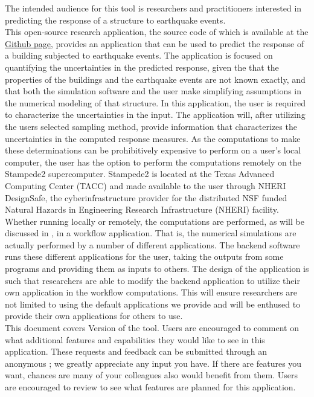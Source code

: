 The intended audience for this tool is researchers and practitioners
interested in predicting the response of a structure to earthquake
events.\\

This open-source research application, the source code of which is
available at
the \href{https://github.com/NHERI-SimCenter/EE-UQ}{\texttt{\getsoftwarename{}}
Github page}, provides an application that can be used to predict the
response of a building subjected to earthquake events. The application
is focused on quantifying the uncertainties in the predicted response,
given the that the properties of the buildings and the earthquake
events are not known exactly, and that both the simulation software
and the user make simplifying assumptions in the numerical modeling of
that structure. In this application, the user is required to
characterize the uncertainties in the input. The application will,
after utilizing the users selected sampling method, provide
information that characterizes the uncertainties in the computed
response measures. As the computations to make these determinations
can be prohibitively expensive to perform on a user's local computer,
the user has the option to perform the computations remotely on the
Stampede2 supercomputer. Stampede2 is located at the Texas Advanced
Computing Center (TACC) and made available to the user through NHERI
DesignSafe, the cyberinfrastructure provider for the distributed NSF
funded Natural Hazards in Engineering Research Infrastructure (NHERI)
facility.\\

Whether running locally or remotely, the computations are performed,
as will be discussed in , in a workflow
application. That is, the numerical simulations are actually performed
by a number of different applications. The \texttt{\getsoftwarename{}} backend software runs
these different applications for the user, taking the outputs from
some programs and providing them as inputs to others. The design of
the \texttt{\getsoftwarename{}} application is such that researchers are able to modify the
backend application to utilize their own application in the workflow
computations. This will ensure researchers are not limited to using
the default applications we provide and will be enthused to provide
their own applications for others to use. \\

This document covers Version \getsoftwareversion{} of the tool. Users are
encouraged to comment on what additional features and capabilities
they would like to see in this application. These requests and
feedback can be submitted through an anonymous ; we greatly appreciate any input you have. If there are
features you want, chances are many of your colleagues also would
benefit from them. Users are encouraged to review
 to see what features are planned for this
application.
